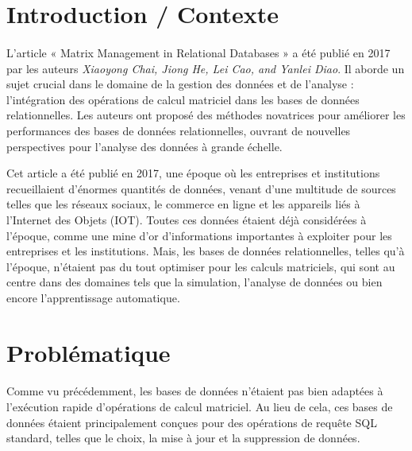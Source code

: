 \documentclass[a4paper, 12pt]{article}
\begin{document}
\newpage		
\tableofcontents %



\clearpage 

\section{Introduction / Contexte}

\paragraph{}
L'article « Matrix Management in Relational Databases » a été publié en 2017 par les auteurs \textit{Xiaoyong Chai, Jiong He, Lei Cao, and Yanlei Diao}. Il aborde un sujet crucial dans le domaine de la gestion des données et de l'analyse : l'intégration des opérations de calcul matriciel dans les bases de données relationnelles. Les auteurs ont proposé des méthodes novatrices pour améliorer les performances des bases de données relationnelles, ouvrant de nouvelles perspectives pour l'analyse des données à grande échelle.

Cet article a été publié en 2017, une époque où les entreprises et institutions recueillaient d'énormes quantités de données, venant d'une multitude de sources telles que les réseaux sociaux, le commerce en ligne et les appareils liés à l'Internet des Objets (IOT). Toutes ces données étaient déjà considérées à l'époque, comme une mine d'or d'informations importantes à exploiter pour les entreprises et les institutions. Mais, les bases de données relationnelles, telles qu'à l'époque, n'étaient pas du tout optimiser pour les calculs matriciels, qui sont au centre dans des domaines tels que la simulation, l'analyse de données ou bien encore l'apprentissage automatique.

\clearpage 
\section{Problématique}

\paragraph{}
Comme vu précédemment, les bases de données n'étaient pas bien adaptées à l'exécution rapide d'opérations de calcul matriciel. Au lieu de cela, ces bases de données étaient principalement conçues pour des opérations de requête SQL standard, telles que le choix, la mise à jour et la suppression de données.
 
\end{document}
